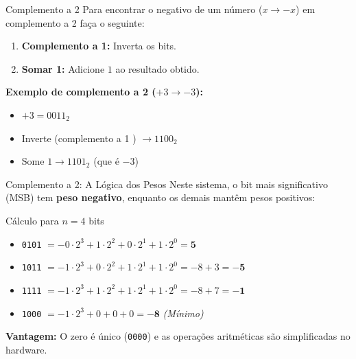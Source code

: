 \begin{frame}{Complemento a 2}
    Para encontrar o negativo de um número ($x \rightarrow -x$) em complemento a 2 faça o seguinte:

    \begin{enumerate}
        \item \textbf{Complemento a 1:} Inverta os bits.
        \item \textbf{Somar 1:} Adicione $1$ ao resultado obtido.
    \end{enumerate}

    \textbf{Exemplo de complemento a 2 ($+3 \rightarrow -3$):}
    \begin{itemize}
        \item $+3 = 0011_2$
        \item Inverte (complemento a 1 ) $\rightarrow 1100_2$
        \item Some $1 \rightarrow 1101_2$ (que é $-3$)
    \end{itemize}
\end{frame}

\begin{frame}{Complemento a 2: A Lógica dos Pesos}
    Neste sistema, o bit mais significativo (MSB) tem \textbf{peso negativo}, enquanto os demais mantêm pesos positivos:

    \begin{exampleblock}{Cálculo para $n=4$ bits}
        \begin{itemize}
            \item \texttt{0101} $= -0 \cdot 2^3 + 1 \cdot 2^2 + 0 \cdot 2^1 + 1 \cdot 2^0 = \mathbf{5}$
            \item \texttt{1011} $= -1 \cdot 2^3 + 0 \cdot 2^2 + 1 \cdot 2^1 + 1 \cdot 2^0 = -8 + 3 = \mathbf{-5}$
            \item \texttt{1111} $= -1 \cdot 2^3 + 1 \cdot 2^2 + 1 \cdot 2^1 + 1 \cdot 2^0 = -8 + 7 = \mathbf{-1}$
            \item \texttt{1000} $= -1 \cdot 2^3 + 0 + 0 + 0 = \mathbf{-8}$ \textit{(Mínimo)}
        \end{itemize}
    \end{exampleblock}

    \textbf{Vantagem:} O zero é único (\texttt{0000}) e as operações aritméticas são simplificadas no hardware.
\end{frame}



